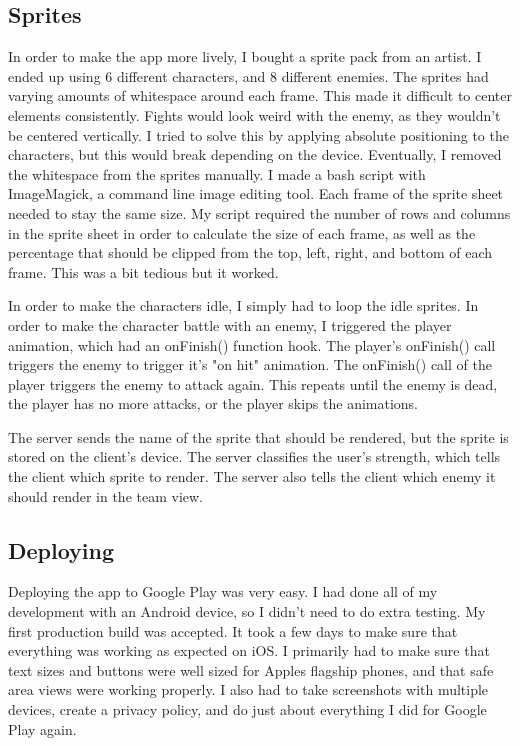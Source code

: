 \documentclass{l4proj}
\begin{document}
\subsection{Sprites}
In order to make the app more lively, I bought a sprite pack from an artist. I ended up using 6 different characters, and 8 different enemies. The sprites had varying amounts of whitespace around each frame. This made it difficult to center elements consistently. Fights would look weird with the enemy, as they wouldn't be centered vertically. I tried to solve this by applying absolute positioning to the characters, but this would break depending on the device. Eventually, I removed the whitespace from the sprites manually. I made a bash script with ImageMagick, a command line image editing tool. Each frame of the sprite sheet needed to stay the same size. My script required the number of rows and columns in the sprite sheet in order to calculate the size of each frame, as well as the percentage that should be clipped from the top, left, right, and bottom of each frame. This was a bit tedious but it worked.

In order to make the characters idle, I simply had to loop the idle sprites. In order to make the character battle with an enemy, I triggered the player animation, which had an onFinish() function hook. The player's onFinish() call triggers the enemy to trigger it's "on hit" animation. The onFinish() call of the player triggers the enemy to attack again. This repeats until the enemy is dead, the player has no more attacks, or the player skips the animations.

The server sends the name of the sprite that should be rendered, but the sprite is stored on the client's device. The server classifies the user's strength, which tells the client which sprite to render. The server also tells the client which enemy it should render in the team view.


\subsection{Deploying}
Deploying the app to Google Play was very easy. I had done all of my development with an Android device, so I didn't need to do extra testing. My first production build was accepted. It took a few days to make sure that everything was working as expected on iOS. I primarily had to make sure that text sizes and buttons were well sized for Apples flagship phones, and that safe area views were working properly. I also had to take screenshots with multiple devices, create a privacy policy, and do just about everything I did for Google Play again. 
\end{document}
